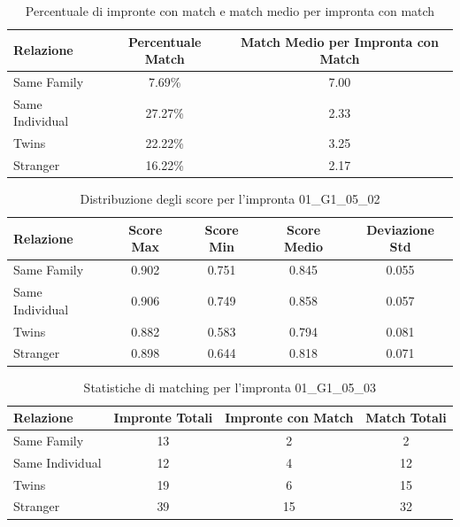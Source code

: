\begin{table}[htbp]
\centering
\caption{Percentuale di impronte con match e match medio per impronta con match}
\label{tab:match_percentage_01_G1_05_02}
\begin{tabular}{|l|c|c|}
\hline
\textbf{Relazione} & \textbf{Percentuale Match} & \textbf{Match Medio per Impronta con Match} \\
\hline
Same Family & 7.69\% & 7.00 \\
\hline
Same Individual & 27.27\% & 2.33 \\
\hline
Twins & 22.22\% & 3.25 \\
\hline
Stranger & 16.22\% & 2.17 \\
\hline
\end{tabular}
\end{table}


\begin{table}[htbp]
\centering
\caption{Distribuzione degli score per l'impronta 01\_G1\_05\_02}
\label{tab:scores_01_G1_05_02}
\begin{tabular}{|l|c|c|c|c|}
\hline
\textbf{Relazione} & \textbf{Score Max} & \textbf{Score Min} & \textbf{Score Medio} & \textbf{Deviazione Std} \\
\hline
Same Family & 0.902 & 0.751 & 0.845 & 0.055 \\
\hline
Same Individual & 0.906 & 0.749 & 0.858 & 0.057 \\
\hline
Twins & 0.882 & 0.583 & 0.794 & 0.081 \\
\hline
Stranger & 0.898 & 0.644 & 0.818 & 0.071 \\
\hline
\end{tabular}
\end{table}


\begin{table}[htbp]
\centering
\caption{Statistiche di matching per l'impronta 01\_G1\_05\_03}
\label{tab:results_01_G1_05_03}
\begin{tabular}{|l|c|c|c|}
\hline
\textbf{Relazione} & \textbf{Impronte Totali} & \textbf{Impronte con Match} & \textbf{Match Totali} \\
\hline
Same Family & 13 & 2 & 2 \\
\hline
Same Individual & 12 & 4 & 12 \\
\hline
Twins & 19 & 6 & 15 \\
\hline
Stranger & 39 & 15 & 32 \\
\hline
\end{tabular}
\end{table}


